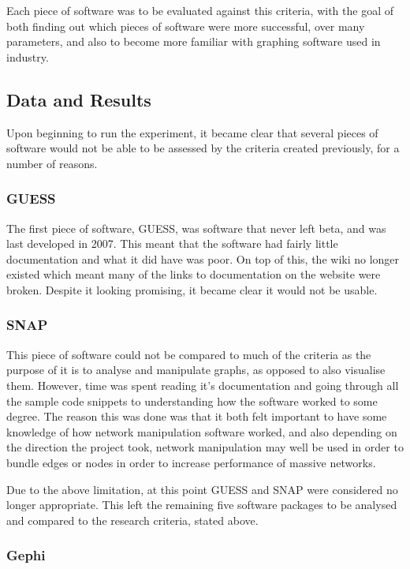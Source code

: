 \documentclass[../dissertation.tex]{subfiles}
\begin{document}
Each piece of software was to be evaluated against this criteria, with the goal of both finding out which pieces of software were more successful, over many parameters, and also to become more familiar with graphing software used in industry.

\subsection{Data and Results}

Upon beginning to run the experiment, it became clear that several pieces of software would not be able to be assessed by the criteria created previously, for a number of reasons.

\subsubsection{GUESS}

The first piece of software, GUESS, was software that never left beta, and was last developed in 2007. This meant that the software had fairly little documentation and what it did have was poor. On top of this, the wiki no longer existed which meant many of the links to documentation on the website were broken. Despite it looking promising, it became clear it would not be usable.

\subsubsection{SNAP}

This piece of software could not be compared to much of the criteria as the purpose of it is to analyse and manipulate graphs, as opposed to also visualise them. However, time was spent reading it’s documentation and going through all the sample code snippets to understanding how the software worked to some degree. The reason this was done was that it both felt important to have some knowledge of how network manipulation software worked, and also depending on the direction the project took, network manipulation may well be used in order to bundle edges or nodes in order to increase performance of massive networks.

Due to the above limitation, at this point GUESS and SNAP were considered no longer appropriate. This left the remaining five software packages to be analysed and compared to the research criteria, stated above.

\subsubsection{Gephi}
\end{document}
